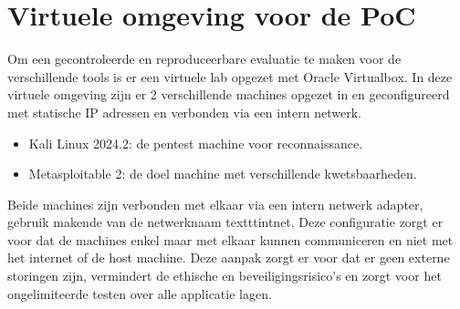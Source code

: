 \section{Virtuele omgeving voor de PoC}
Om een gecontroleerde en reproduceerbare evaluatie te maken voor de verschillende tools is er een virtuele lab opgezet met Oracle Virtualbox.
In deze virtuele omgeving zijn er 2 verschillende machines opgezet in en geconfigureerd met statische IP adressen en verbonden via een intern netwerk.

\begin{itemize}
  \item Kali Linux 2024.2: de pentest machine voor reconnaissance. %
  \item Metasploitable 2: de doel machine met verschillende kwetsbaarheden. %
\end{itemize}

Beide machines zijn verbonden met elkaar via een intern netwerk adapter, gebruik makende van de netwerknaam texttt{intnet}.
Deze configuratie zorgt er voor dat de machines enkel maar met elkaar kunnen communiceren en niet met het internet of de host machine.
Deze aanpak zorgt er voor dat er geen externe storingen zijn, vermindert de ethische en beveiligingsrisico's en zorgt voor het ongelimiteerde testen over alle applicatie lagen.
